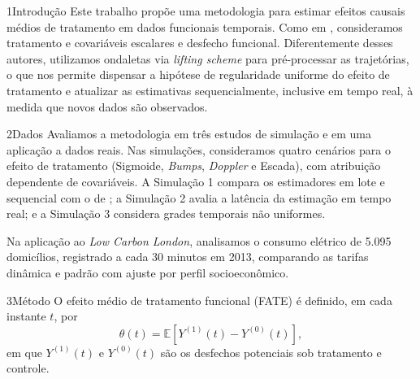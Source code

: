 \documentclass{rbras-poster}
\begin{document}
\begin{colunaesquerda}
\setlength\rbespacosecao{35bp}
\begin{secao}{1}{Introdução}
Este trabalho propõe uma metodologia para estimar efeitos causais médios de tratamento em dados funcionais temporais. Como em \citet{ecker_causal_2024}, consideramos tratamento e covariáveis escalares e desfecho funcional. Diferentemente desses autores, utilizamos ondaletas via \textit{lifting scheme} para pré-processar as trajetórias, o que nos permite dispensar a hipótese de regularidade uniforme do efeito de tratamento e atualizar as estimativas sequencialmente, inclusive em tempo real, à medida que novos dados são observados.
\end{secao}
\begin{secao}{2}{Dados}
Avaliamos a metodologia em três estudos de simulação e em uma aplicação a dados reais. Nas simulações, consideramos quatro cenários para o efeito de tratamento (Sigmoide, \textit{Bumps}, \textit{Doppler} e Escada), com atribuição dependente de covariáveis. A Simulação 1 compara os estimadores em lote e sequencial com o de \citet{ecker_causal_2024}; a Simulação 2 avalia a latência da estimação em tempo real; e a Simulação 3 considera grades temporais não uniformes.

Na aplicação ao \textit{Low Carbon London}, analisamos o consumo elétrico de 5.095 domicílios, registrado a cada 30 minutos em 2013, comparando as tarifas dinâmica e padrão com ajuste por perfil socioeconômico.
\end{secao}
\begin{secao}{3}{Método}
O efeito médio de tratamento funcional (FATE) é definido, em cada instante $t$, por
\[
\theta(t)=\mathbb{E}\!\left[Y^{(1)}(t)-Y^{(0)}(t)\right],
\]
em que $Y^{(1)}(t)$ e $Y^{(0)}(t)$ são os desfechos potenciais sob tratamento e controle.
\end{secao}
\end{colunaesquerda}
\end{document}
